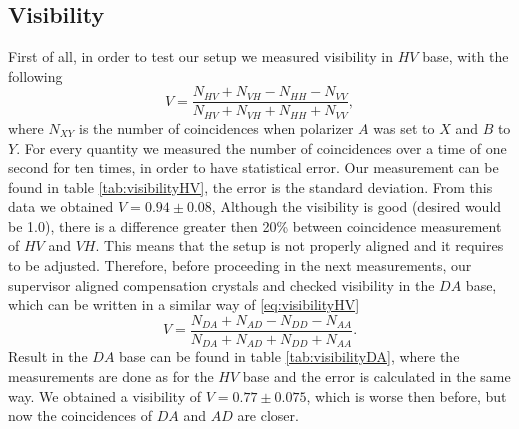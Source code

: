 \documentclass[a4paper,10pt]{article}
\begin{document}
\subsection{Visibility}
First of all, in order to test our setup we measured visibility in $HV$ base, with the following
\begin{equation}\label{eq:visibilityHV}V = \frac{N_{HV}+N_{VH}-N_{HH}-N_{VV}}{N_{HV}+N_{VH}+N_{HH}+N_{VV}},\end{equation}
where $N_{XY}$ is the number of coincidences when polarizer $A$ was set to $X$ and $B$ to $Y$. For every quantity we measured the number of coincidences over a time of one second for ten times, in order to have statistical error. Our measurement can be found in table \ref{tab:visibilityHV}, the error is the standard deviation. From this data we obtained $V = 0.94 \pm 0.08$,
Although the visibility is good (desired would be 1.0), there is a difference greater then 20\% between coincidence measurement of $HV$ and $VH$. This means that the setup is not properly aligned and it requires to be adjusted. Therefore, before proceeding in the next measurements, our supervisor aligned compensation crystals and checked visibility in the $DA$ base, which can be written in a similar way of \eqref{eq:visibilityHV}
\begin{equation}V = \frac{N_{DA}+N_{AD}-N_{DD}-N_{AA}}{N_{DA}+N_{AD}+N_{DD}+N_{AA}}.\end{equation}
Result in the $DA$ base can be found in table \ref{tab:visibilityDA}, where the measurements are done as for the $HV$ base and the error is calculated in the same way. We obtained a visibility of $V =  0.77\pm0.075$, which is worse then before, but now the coincidences of $DA$ and $AD$ are closer.
\end{document}
